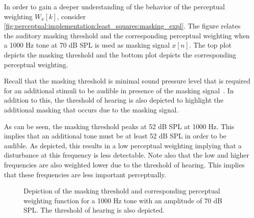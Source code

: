In order to gain a deeper understanding of the behavior of the perceptual weighting $W_x[k]$, consider 
\autoref{fig:perceptual:implementation:least_squares:masking_expl}.
The figure relates the auditory masking threshold and the corresponding 
perceptual weighting when a 1000 Hz tone at 70 dB SPL is used as masking signal $x[n]$.
The top plot depicts the masking threshold and the bottom plot depicts the corresponding perceptual weighting.

Recall that the masking threshold is minimal sound pressure level that is required for an 
additional stimuli to be audible in presence of the masking signal~\cite{painter2000perceptual}.
In addition to this, the threshold of hearing is also depicted to highlight the additional 
masking that occurs due to the masking signal.

As can be seen, the masking threshold peaks at 52 dB SPL at 1000 Hz.
This implies that an additional tone must be at least 52 dB SPL in order to be audible.
As depicted, this results in a low perceptual weighting implying that a disturbance at this frequency is less detectable.
Note also that the low and higher frequencies are also weighted lower due to the threshold of hearing.
This implies that these frequencies are less important perceptually.

\begin{figure}[]
    \centering
    \scalebox{1.0}{}
    \caption{Depiction of the masking threshold and corresponding perceptual weighting 
        function for a 1000 Hz tone with an amplitude of 70 dB SPL.
        The threshold of hearing is also depicted.}
    \label{fig:perceptual:implementation:least_squares:masking_expl}
\end{figure}
